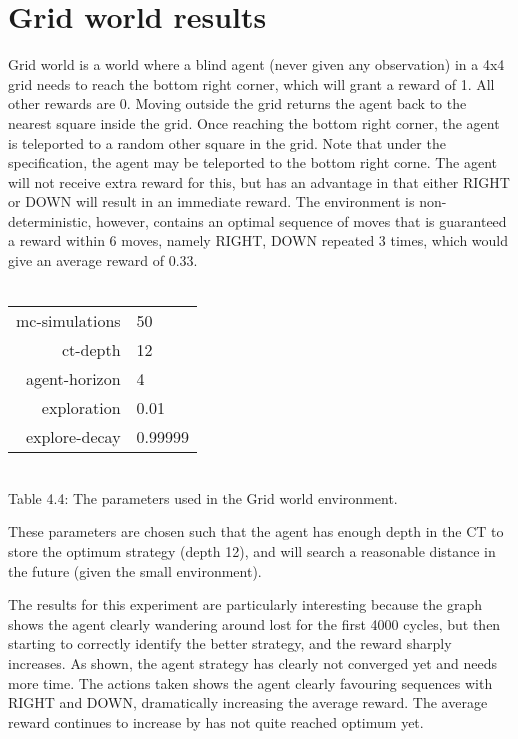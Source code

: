 \documentclass[pdftex,twoside,a4paper]{report}
\begin{document}
\section{Grid world results}
Grid world is a world where a blind agent (never given any observation) in a 4x4 grid needs to reach the bottom right corner, which will grant a reward of 1. All other rewards are 0. Moving outside the grid returns the agent back to the nearest square inside the grid. Once reaching the bottom right corner, the agent is teleported to a random other square in the grid. Note that under the specification, the agent may be teleported to the bottom right corne. The agent will not receive extra reward for this, but has an advantage in that either RIGHT or DOWN will result in an immediate reward. The environment is non-deterministic, however, contains an optimal sequence of moves that is guaranteed a reward within 6 moves, namely RIGHT, DOWN repeated 3 times, which would give an average reward of 0.33.\\\\
\begin{center}
\begin{tabular}{| r | l | }
\hline
mc-simulations & 50\\
ct-depth & 12\\
agent-horizon & 4\\
exploration & 0.01\\
explore-decay & 0.99999\\
\hline
\end{tabular}\\
\vspace{0.5mm}
Table 4.4: The parameters used in the Grid world environment.
\end{center}
These parameters are chosen such that the agent has enough depth in the CT to store the optimum strategy (depth 12), and will search a reasonable distance in the future (given the small environment).

The results for this experiment are particularly interesting because the graph shows the agent clearly wandering around lost for the first 4000 cycles, but then starting to correctly identify the better strategy, and the reward sharply increases. As shown, the agent strategy has clearly not converged yet and needs more time. The actions taken shows the agent clearly favouring sequences with RIGHT and DOWN, dramatically increasing the average reward. The average reward continues to increase by has not quite reached optimum yet.
\end{document}
